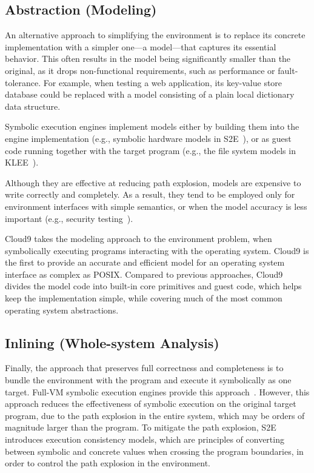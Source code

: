 \subsection{Abstraction (Modeling)}

An alternative approach to simplifying the environment is to replace its concrete implementation with a simpler one---a model---that captures its essential behavior.
%
This often results in the model being significantly smaller than the original, as it drops non-functional requirements, such as performance or fault-tolerance.  For example, when testing a web application, its key-value store database could be replaced with a model consisting of a plain local dictionary data structure.

Symbolic execution engines implement models either by building them into the engine implementation (e.g., symbolic hardware models in S2E~\cite{s2eSystem}), or as guest code running together with the target program (e.g., the file system models in KLEE~\cite{klee}).

Although they are effective at reducing path explosion, models are expensive to write correctly and completely.  As a result, they tend to be employed only for environment interfaces with simple semantics, or when the model accuracy is less important (e.g., security testing~\cite{aeg}).

Cloud9 takes the modeling approach to the environment problem, when symbolically executing programs interacting with the operating system.  Cloud9 is the first to provide an accurate and efficient model for an operating system interface as complex as POSIX.  Compared to previous approaches, Cloud9 divides the model code into built-in core primitives and guest code, which helps keep the implementation simple, while covering much of the most common operating system abstractions.

\subsection{Inlining (Whole-system Analysis)}

Finally, the approach that preserves full correctness and completeness is to bundle the environment with the program and execute it symbolically as one target.
%
Full-VM symbolic execution engines provide this approach~\cite{s2e,bitBlaze}.
%
However, this approach reduces the effectiveness of symbolic execution on the original target program, due to the path explosion in the entire system, which may be orders of magnitude larger than the program.
%
To mitigate the path explosion, S2E introduces execution consistency models, which are principles of converting between symbolic and concrete values when crossing the program boundaries, in order to control the path explosion in the environment.

